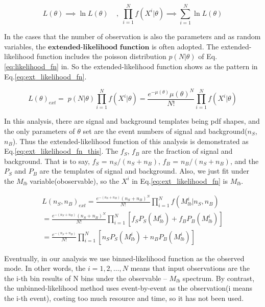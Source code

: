 		\begin{equation}
		L(\theta) \implies \ln{L(\theta)} \; \; \; \; , \; \prod_{i=1}^{N} f(X^i|\theta) \implies \sum_{i=1}^{N} \ln{L(\theta)}
		\label{eq:nature_log_L}
		\end{equation}

		In the cases that the number of observation is also the parameters and as random variables, the $\textbf{extended-likelihood function}$ is often adopted. The extended-likelihood function includes the poisson distribution $p(N|\theta)$ of Eq.\ref{eq:likelihood_fn} in. So the extended-likelihood function shows as the pattern in Eq.\ref{eq:ext_likelihood_fn}. 

		\begin{equation}
		L(\theta)_{ext} = 􏱛p(N|\theta) \prod_{i=1}^{N} f(X^i|\theta) = \frac{e^{-\mu(\theta)}\mu(\theta)^{N}}{N!} \prod_{i=1}^{N} f(X^i|\theta)
		\label{eq:ext_likelihood_fn}
		\end{equation}


		In this analysis, there are signal and background templates being pdf shapes, and the only parameters of $\theta$ set are the event numbers of signal and background($n_{S}$, $n_{B}$). Thus the extended-likelihood function of this analysis is demonstrated as Eq.\ref{eq:ext_likelihood_fn_this}. The $f_{S}$, $f_{B}$ are the fraction of signal and background. That is to say, $f_{S}$ = $n_{S}/(n_{S}+n_{B})$, $f_{B}$ = $n_{B}/(n_{S}+n_{B})$, and the $P_{S}$ and $P_{B}$ are the templates of signal and background. Also, we just fit under the $M_{lb}$ variable(oboservable), so the $X^i$ in Eq.\ref{eq:ext_likelihood_fn} is $M_{lb}$.

		
		\begin{equation}
		\begin{split}
		L(n_{S},n_{B})_{ext} = \frac{e^{-(n_{S}+n_{B})}(n_{S}+n_{B})^{N}}{N!} \prod_{i=1}^{N} f(M_{lb}^i|n_{S},n_{B}) \\
		= \frac{e^{-(n_{S}+n_{B})}(n_{S}+n_{B})^{N}}{N!} \prod_{i=1}^{N} [f_{S}P_{S}(M_{lb}^i) + f_{B}P_{B}(M_{lb}^i)] \\
		 = \frac{e^{-(n_{S}+n_{B})}}{N!} \prod_{i=1}^{N} [n_{S}P_{S}(M_{lb}^i) + n_{B}P_{B}(M_{lb}^i)]
		\end{split}
		\label{eq:ext_likelihood_fn_this}
		\end{equation}

		Eventually, in our analysis we use binned-likelihood function as the observed mode. In other words, the $i=1,2,\ldots,N$ means that input observations are the the i-th bin results of N bins under the observable -- $M_{lb}$ spectrum. By contrast, the unbinned-likelihood method uses event-by-event as the observation(i means the i-th event), costing too much resource and time, so it has not been used.


